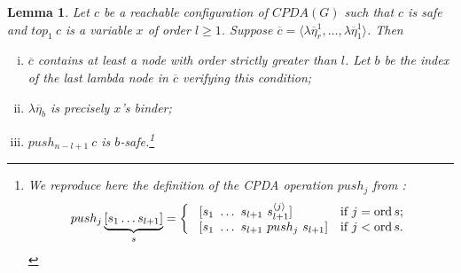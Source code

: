 \documentclass{article}
\newcommand{\ord}{\mathop{\mathrm{ord}}}
\newtheorem{lemma}{Lemma}[section]
\theoremstyle{remark}
\theoremstyle{definition}
\newcommand\orddec\overline
\begin{document}
\begin{lemma}
\label{lem:pushj_safe_implies_b-safe} Let $c$ be a reachable
configuration of $CPDA(G)$ such that $c$ is \emph{safe} and $top_1\
c$ is a variable $x$ of order $l\geq 1$. Suppose $\orddec{c} =
\langle \lambda \overline{\eta}_r^1 , \ldots, \lambda
\overline{\eta}_1^1   \rangle$. Then
\begin{enumerate}[i.]
\item $\orddec{c}$ contains at least a node with order strictly
greater than $l$. Let $b$ be the index of the last lambda node
in $\orddec{c}$ verifying this condition;

\item $\lambda \overline{\eta}_{b}$ is precisely $x$'s binder;

\item $push_{n-l+1}\ c$ is $b$-safe.\footnote{We reproduce here the definition of the
CPDA operation $push_j$ from \cite{hague-sto07}:
$$ push_j \underbrace{[ s_1 \ldots s_{l+1} ]}_{s} =
\left\{
  \begin{array}{ll}
\    [s_1\ \ldots\ s_{l+1}\ s_{l+1}^{\langle j \rangle}]  &\hbox{if $j = \ord{s}$;}\\
\    [s_1\ \ldots\ s_{l+1}\ push_j\ s_{l+1}]  &\hbox{if $j<\ord{s}$.}
 \end{array}
\right.
$$}

\end{enumerate}
\end{lemma}
\end{document}
